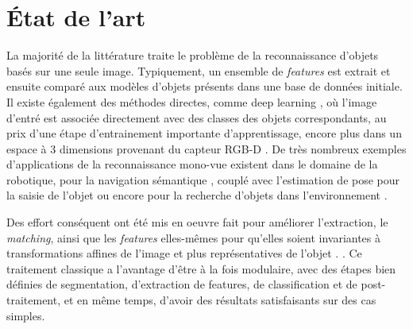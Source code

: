 
\section{État de l'art}


La majorité de la littérature traite le problème de la reconnaissance d'objets basés sur une seule image. Typiquement, un ensemble de \textit{features} \cite{frome2004recognizing}  est extrait et ensuite comparé aux modèles d'objets présents dans une base de données initiale. Il existe également des méthodes directes, comme deep learning , où l'image d'entré est associée directement avec des classes des objets correspondants, au prix d'une étape d'entrainement importante d'apprentissage, encore plus dans un espace à 3 dimensions provenant du capteur RGB-D . De très nombreux exemples d'applications de la reconnaissance mono-vue existent dans le domaine de la robotique, pour la navigation sémantique \cite{caron2014neural}, couplé avec l'estimation de pose pour la saisie de l'objet \cite{burel1995three} ou encore pour la recherche d'objets dans l'environnement \cite{kragic2009object,ali2014contextual}.

Des effort conséquent ont été mis en oeuvre fait pour améliorer l'extraction, le \textit {matching}, ainsi que les \textit{features} elles-mêmes pour qu'elles soient invariantes à transformations affines de l'image et plus représentatives de l'objet . . Ce traitement classique a l’avantage d'être à la fois modulaire, avec des étapes bien définies de segmentation, d'extraction de features, de classification et de post-traitement, et en même temps, d'avoir des résultats satisfaisants sur des cas simples. 

